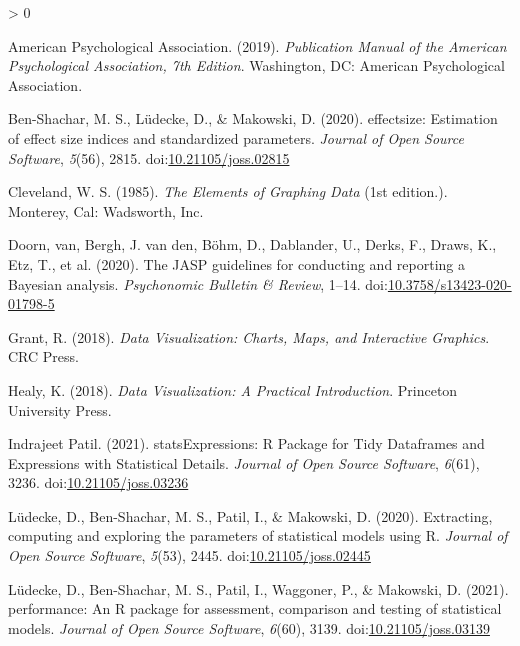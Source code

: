 \documentclass[
]{article}
\newlength{\cslhangindent}
\newenvironment{CSLReferences}[2] %
 {%
  \setlength{\parindent}{0pt}
  \ifodd #1 \everypar{\setlength{\hangindent}{\cslhangindent}}\ignorespaces\fi
  \ifnum #2 > 0
  \setlength{\parskip}{#2\baselineskip}
  \fi
 }%
 {}
\begin{document}
\hypertarget{refs}{}
\begin{CSLReferences}{1}{0}
\leavevmode\hypertarget{ref-apa2019}{}%
American Psychological Association. (2019). \emph{Publication {Manual}
of the {American Psychological Association}, 7th {Edition}}.
{Washington, DC}: {American Psychological Association}.

\leavevmode\hypertarget{ref-Ben-Shachar2020}{}%
Ben-Shachar, M. S., Lüdecke, D., \& Makowski, D. (2020). {e}ffectsize:
Estimation of effect size indices and standardized parameters.
\emph{Journal of Open Source Software}, \emph{5}(56), 2815.
doi:\href{https://doi.org/10.21105/joss.02815}{10.21105/joss.02815}

\leavevmode\hypertarget{ref-cleveland1985}{}%
Cleveland, W. S. (1985). \emph{The {Elements} of {Graphing Data}} (1st
edition.). {Monterey, Cal}: {Wadsworth, Inc.}

\leavevmode\hypertarget{ref-van2020jasp}{}%
Doorn, van, Bergh, J. van den, Böhm, D., Dablander, U., Derks, F.,
Draws, K., Etz, T., et al. (2020). The JASP guidelines for conducting
and reporting a {B}ayesian analysis. \emph{Psychonomic Bulletin \&
Review}, 1--14.
doi:\href{https://doi.org/10.3758/s13423-020-01798-5}{10.3758/s13423-020-01798-5}

\leavevmode\hypertarget{ref-grant2018data}{}%
Grant, R. (2018). \emph{{Data Visualization: Charts, Maps, and
Interactive Graphics}}. CRC Press.

\leavevmode\hypertarget{ref-healy2018data}{}%
Healy, K. (2018). \emph{{Data Visualization: A Practical Introduction}}.
Princeton University Press.

\leavevmode\hypertarget{ref-Patil2021}{}%
Indrajeet Patil. (2021). {statsExpressions: {R} Package for Tidy
Dataframes and Expressions with Statistical Details}. \emph{{Journal of
Open Source Software}}, \emph{6}(61), 3236.
doi:\href{https://doi.org/10.21105/joss.03236}{10.21105/joss.03236}

\leavevmode\hypertarget{ref-Luxfcdecke2020parameters}{}%
Lüdecke, D., Ben-Shachar, M. S., Patil, I., \& Makowski, D. (2020).
Extracting, computing and exploring the parameters of statistical models
using {R}. \emph{Journal of Open Source Software}, \emph{5}(53), 2445.
doi:\href{https://doi.org/10.21105/joss.02445}{10.21105/joss.02445}

\leavevmode\hypertarget{ref-Luxfcdecke2020performance}{}%
Lüdecke, D., Ben-Shachar, M. S., Patil, I., Waggoner, P., \& Makowski,
D. (2021). {performance}: An {R} package for assessment, comparison and
testing of statistical models. \emph{Journal of Open Source Software},
\emph{6}(60), 3139.
doi:\href{https://doi.org/10.21105/joss.03139}{10.21105/joss.03139}


\end{CSLReferences}
\end{document}
